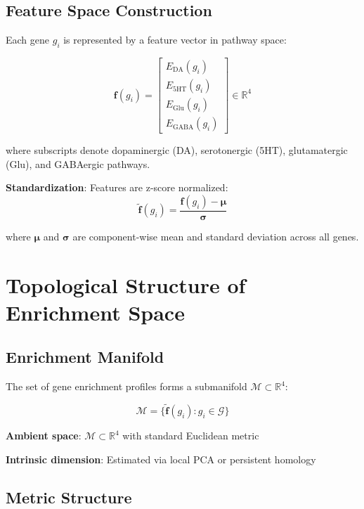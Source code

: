 \documentclass[12pt,letterpaper]{article}
\theoremstyle{definition}
\theoremstyle{remark}
\begin{document}
\subsection{Feature Space Construction}

Each gene $g_i$ is represented by a feature vector in pathway space:

\begin{equation}
\mathbf{f}(g_i) = \begin{bmatrix}
E_{\text{DA}}(g_i) \\
E_{\text{5HT}}(g_i) \\
E_{\text{Glu}}(g_i) \\
E_{\text{GABA}}(g_i)
\end{bmatrix} \in \mathbb{R}^4
\end{equation}

where subscripts denote dopaminergic (DA), serotonergic (5HT), glutamatergic (Glu), and GABAergic pathways.

\textbf{Standardization}: Features are z-score normalized:
\begin{equation}
\tilde{\mathbf{f}}(g_i) = \frac{\mathbf{f}(g_i) - \boldsymbol{\mu}}{\boldsymbol{\sigma}}
\end{equation}

where $\boldsymbol{\mu}$ and $\boldsymbol{\sigma}$ are component-wise mean and standard deviation across all genes.

\section{Topological Structure of Enrichment Space}

\subsection{Enrichment Manifold}

The set of gene enrichment profiles forms a submanifold $\mathcal{M} \subset \mathbb{R}^4$:

\begin{equation}
\mathcal{M} = \{\tilde{\mathbf{f}}(g_i) : g_i \in \mathcal{G}\}
\end{equation}

\textbf{Ambient space}: $\mathcal{M} \subset \mathbb{R}^4$ with standard Euclidean metric

\textbf{Intrinsic dimension}: Estimated via local PCA or persistent homology

\subsection{Metric Structure}
\end{document}
